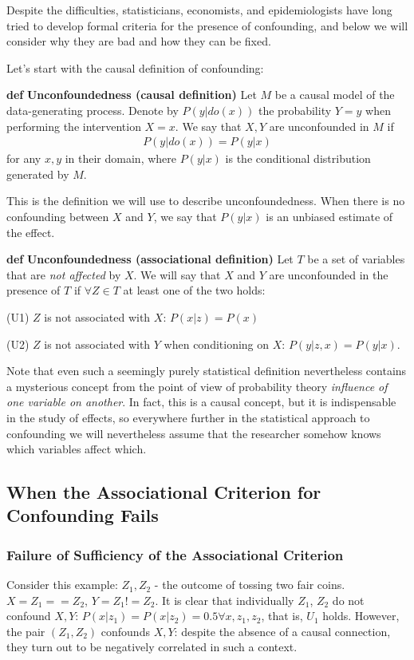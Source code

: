 \documentclass[fleqn]{article}
\def\define#1{\textbf{def} \textbf{#1}}
\numberwithin{equation}{section}
\numberwithin{theorem}{section}
\numberwithin{figure}{section}
\numberwithin{lemma}{section}
\numberwithin{corollary}{section}
\begin{document}
Despite the difficulties, statisticians, economists, and epidemiologists have long tried to develop formal criteria for the presence of confounding, and below we will consider why they are bad and how they can be fixed.

Let's start with the causal definition of confounding:

\define{Unconfoundedness (causal definition)} Let $M$ be a causal model of the data-generating process. Denote by $P(y|do(x))$ the probability $Y = y$ when performing the intervention $X=x$. We say that $X, Y$ are unconfounded in $M$ if 
\begin{align}
	P(y|do(x)) = P(y|x)
\end{align}
for any $x,y$ in their domain, where $P(y|x)$ is the conditional distribution generated by $M$.

This is the definition we will use to describe unconfoundedness. When there is no confounding between $X$ and $Y$, we say that $P(y|x)$ is an unbiased estimate of the effect.

\define{Unconfoundedness (associational definition)} Let $T$ be a set of variables that are \textit{not affected} by $X$. We will say that $X$ and $Y$ are unconfounded in the presence of $T$ if $\forall Z \in T$ at least one of the two holds:

(U1) $Z$ is not associated with $X$: $P(x|z) = P(x)$

(U2) $Z$ is not associated with $Y$ when conditioning on $X$: $P(y|z,x) = P(y|x)$.


Note that even such a seemingly purely statistical definition nevertheless contains a mysterious concept from the point of view of probability theory \textit{influence of one variable on another}. In fact, this is a causal concept, but it is indispensable in the study of effects, so everywhere further in the statistical approach to confounding we will nevertheless assume that the researcher somehow knows which variables affect which.

\subsection*{When the Associational Criterion for Confounding Fails}

\subsubsection*{Failure of Sufficiency of the Associational Criterion}

Consider this example: $Z_1, Z_2$ - the outcome of tossing two fair coins. $X = Z_1 == Z_2$, $Y = Z_1 != Z_2$. It is clear that individually $Z_1$, $Z_2$ do not confound $X,Y$: $P(x|z_1) = P(x|z_2) = 0.5 \forall x, z_1, z_2$, that is, $U_1$ holds. However, the pair $(Z_1,Z_2)$ confounds $X,Y$: despite the absence of a causal connection, they turn out to be negatively correlated in such a context.
\end{document}
